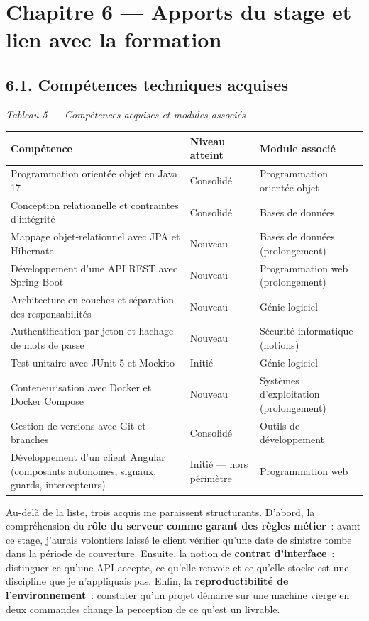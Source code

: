 \documentclass[12pt,a4paper]{report}
\begin{document}
\chapter*{Chapitre 6 — Apports du stage et lien avec la formation}
\section*{6.1. Compétences techniques acquises}
\begin{center}\textit{Tableau 5 — Compétences acquises et modules associés}\end{center}
{\small
\begin{tabularx}{\linewidth}{|X|X|X|}
\hline
\textbf{Compétence} & \textbf{Niveau atteint} & \textbf{Module associé} \\ \hline
Programmation orientée objet en Java 17 & Consolidé & Programmation orientée objet \\ \hline
Conception relationnelle et contraintes d'intégrité & Consolidé & Bases de données \\ \hline
Mappage objet-relationnel avec JPA et Hibernate & Nouveau & Bases de données (prolongement) \\ \hline
Développement d'une API REST avec Spring Boot & Nouveau & Programmation web (prolongement) \\ \hline
Architecture en couches et séparation des responsabilités & Nouveau & Génie logiciel \\ \hline
Authentification par jeton et hachage de mots de passe & Nouveau & Sécurité informatique (notions) \\ \hline
Test unitaire avec JUnit 5 et Mockito & Initié & Génie logiciel \\ \hline
Conteneurisation avec Docker et Docker Compose & Nouveau & Systèmes d'exploitation (prolongement) \\ \hline
Gestion de versions avec Git et branches & Consolidé & Outils de développement \\ \hline
Développement d'un client Angular (composants autonomes, signaux, guards, intercepteurs) & Initié — hors périmètre & Programmation web \\ \hline
\end{tabularx}

}
Au-delà de la liste, trois acquis me paraissent structurants. D'abord, la compréhension du \textbf{rôle du serveur comme garant des règles métier}~: avant ce stage, j'aurais volontiers laissé le client vérifier qu'une date de sinistre tombe dans la période de couverture. Ensuite, la notion de \textbf{contrat d'interface}~: distinguer ce qu'une API accepte, ce qu'elle renvoie et ce qu'elle stocke est une discipline que je n'appliquais pas. Enfin, la \textbf{reproductibilité de l'environnement}~: constater qu'un projet démarre sur une machine vierge en deux commandes change la perception de ce qu'est un livrable.
\end{document}
